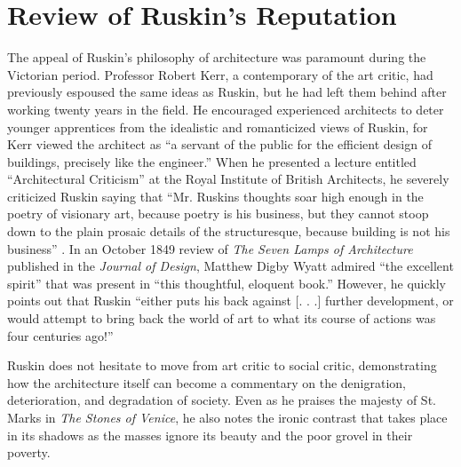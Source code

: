 \section{Review of Ruskin's Reputation}


The appeal of Ruskin’s philosophy of architecture was paramount during
the Victorian period.  Professor Robert Kerr, a contemporary of the art
critic, had previously espoused the same ideas as Ruskin, but he had
left them behind after working twenty years in the field.  He
encouraged experienced architects to deter younger apprentices from the
idealistic and romanticized views of Ruskin, for Kerr viewed the
architect as “a servant of the public for the efficient design of
buildings, precisely like the engineer.”  When he presented a lecture
entitled ``Architectural Criticism'' at the
Royal Institute of British Architects, he severely criticized Ruskin
saying that “Mr. Ruskin{\textquotesingle}s thoughts soar high enough in
the poetry of visionary art, because poetry is his business, but they
cannot stoop down to the plain prosaic details of the structuresque,
because building is not his business” \citep[][pg. 259--260]{collins1998}.  In an
October 1849 review of \textit{The Seven Lamps of Architecture
}published in the \textit{Journal of Design}, Matthew Digby Wyatt
admired “the excellent spirit” that was present in “this thoughtful,
eloquent book.”  However, he quickly points out that Ruskin “either
puts his back against  [. . .] further development, or would attempt to
bring back the world of art to what its course of actions was four
centuries ago!”\citep[][pgs. 121, 438]{mallgrave2009}

Ruskin does not hesitate to move from art critic to social critic,
demonstrating how the architecture itself can become a commentary on
the denigration, deterioration, and degradation of society.  Even as he
praises the majesty of St. Mark{\textquotesingle}s in \textit{The
Stones of Venice}, he also notes the ironic contrast that takes place
in its shadows as the masses ignore its beauty and the poor grovel in
their poverty.  

